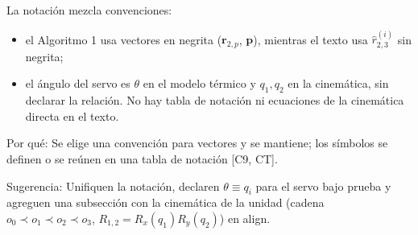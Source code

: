 \documentclass{LabDSTresponse}
\begin{document}
{La notación mezcla convenciones:
\begin{itemize}
    \item el Algoritmo 1 usa vectores en negrita ($\mathbf{r}_{2,p}$, $\mathbf{p}$), mientras el texto usa $\hat{r}_{2,3}^{(i)}$ sin negrita;
    \item el ángulo del servo es $\theta$ en el modelo térmico y $q_1, q_2$ en la cinemática, sin declarar la relación. No hay tabla de notación ni ecuaciones de la cinemática directa en el texto.
\end{itemize}

Por qué: Se elige una convención para vectores y se mantiene; los símbolos se definen o se reúnen en una tabla de notación [C9, CT].

Sugerencia: Unifiquen la notación, declaren $\theta \equiv q_i$ para el servo bajo prueba y agreguen una subsección con la cinemática de la unidad (cadena $o_0 \prec o_1 \prec o_2 \prec o_3$, $R_{1,2} = R_x(q_1)R_y(q_2)$) en align.}
\end{document}

